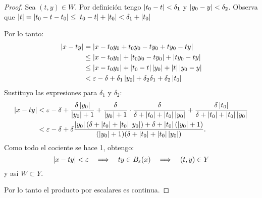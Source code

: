 \begin{proof}
Sea $(t,y)\in W$. Por definici\'on tengo $\left| t_0-t \right|<\delta_1$ y $\left| y_0-y \right|<\delta_2$. Observa que
$\left| t \right|=\left| t_0-t-t_0 \right|\leq\left| t_0-t \right|+\left| t_0 \right|<\delta_1+\left| t_0 \right|$

Por lo tanto:
\begin{align*}%
	\abs{x-ty} & =      \abs{x-t_0y_0+t_0y_0-ty_0+ty_0-ty} \\%
		     & \leq \abs{x-t_0y_0} + \abs{t_0y_0-ty_0} + \abs{ty_0-ty} \\%
		     & \leq \abs{x-t_0y_0} + \abs{t_0-t}\abs{y_0} + \abs{t}\abs{y_0-y} \\%
		     & <    \eps-\delta+\delta_1\abs{y_0} +\delta_2\delta_1+\delta_2\abs{t_0}%
\end{align*}%
Sustituyo las expresiones para $\delta_1$ y $\delta_2$:
\begin{align*}%
	\abs{x-ty} & < \eps - \delta +\frac{\delta\abs{y_0}}{\abs{y_0}+1}+%
	\frac{\delta}{\abs{y_0}+1}\cdot\frac{\delta}{\delta+\abs{t_0}+\abs{t_0}\abs{y_0}}+%
	\frac{\delta\abs{t_0}}{\delta+\abs{t_0}+\abs{t_0}\abs{y_0}}\\%
	 & < \eps-\delta+\delta\frac{\abs{y_0}(\delta+\abs{t_0}+\abs{t_0}\abs{y_0})+\delta+\abs{t_0}(\abs{y_0}+1)}%
	 {(\abs{y_0}+1)(\delta+\abs{t_0}+\abs{t_0}\abs{y_0})}.%
\end{align*}%
Como todo el cociente se hace 1, obtengo:
\[
	\left| x-ty \right| <\varepsilon \quad\Longrightarrow\quad ty\in B_{\varepsilon}(x) \quad\Longrightarrow\quad (t,y)\in Y
\]
y as\'i $W\subset Y$.

Por lo tanto el producto por escalares es continua.
\end{proof}%

